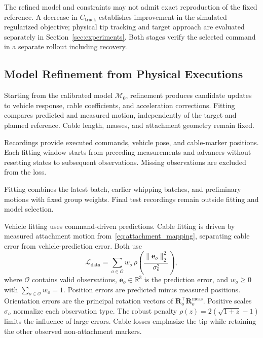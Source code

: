 \documentclass[letterpaper, 10 pt, conference]{ieeeconf}
\begin{document}
The refined model and constraints may not admit exact reproduction
of the fixed reference. A decrease in $C_{\mathrm{track}}$ establishes
improvement in the simulated regularized objective; physical tip
tracking and target approach are evaluated separately in
Section~\ref{sec:experiments}.
Both stages verify the selected command in a separate rollout
including recovery.

\subsection{Model Refinement from Physical Executions}
\label{subsec:model_refinement}

Starting from the calibrated model $\mathcal M_0$, refinement
produces candidate updates to vehicle response, cable coefficients,
and acceleration corrections. Fitting compares predicted and
measured motion, independently of the target and planned reference.
Cable length, masses, and attachment geometry remain fixed.

Recordings provide executed commands, vehicle pose, and cable-marker
positions. Each fitting window starts from preceding measurements
and advances without resetting states to subsequent observations.
Missing observations are excluded from the loss.

Fitting combines the latest batch, earlier whipping batches,
and preliminary motions with fixed group weights.
Final test recordings remain outside fitting and model selection.

Vehicle fitting uses command-driven predictions. Cable fitting is
driven by measured attachment motion from~\eqref{eq:attachment_mapping},
separating cable error from vehicle-prediction error. Both use
\begin{equation}
\mathcal L_{\mathrm{data}}
=\sum_{o\in\mathcal O}w_o\,\rho\!\left(\frac{\|\mathbf e_o\|_2^2}{\sigma_o^2}\right),
\label{eq:refinement_data_loss}
\end{equation}
where $\mathcal O$ contains valid observations,
$\mathbf e_o\in\mathbb R^3$ is the prediction error, and
$w_o\geq0$ with $\sum_{o\in\mathcal O}w_o=1$.
Position errors are predicted minus measured positions.
Orientation errors are the principal rotation vectors of
$\mathbf R_o^\top\mathbf R_o^{\mathrm{meas}}$.
Positive scales $\sigma_o$ normalize each observation type. The robust penalty
$\rho(z)=2(\sqrt{1+z}-1)$ limits the influence of large errors.
Cable losses emphasize the tip while retaining the other observed
non-attachment markers.
\end{document}
